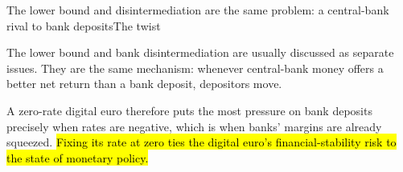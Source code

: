 \documentclass[aspectratio=169,9pt]{beamer}
\begin{document}
\begin{frame}{The lower bound and disintermediation are the same problem: a central-bank rival to bank deposits}{The twist}
  \vspace{0.3cm}
  \begin{center}
  \end{center}
  \vspace{0.5cm}
  \small
  The lower bound and bank disintermediation are usually discussed as separate issues. They are the same mechanism: whenever central-bank money offers a better net return than a bank deposit, depositors move.

  \vspace{0.6em}
  A zero-rate digital euro therefore puts the most pressure on bank deposits precisely when rates are negative, which is when banks' margins are already squeezed. \hl{Fixing its rate at zero ties the digital euro's financial-stability risk to the state of monetary policy.}
\end{frame}
\end{document}
